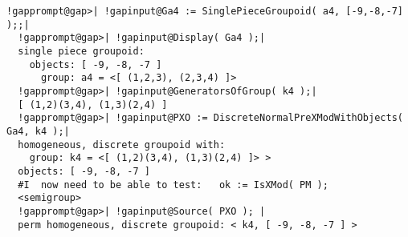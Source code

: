 \documentclass[a4paper,11pt]{report}
\begin{document}
{{\begin{Verbatim}[commandchars=!@|,fontsize=\small,frame=single,label=Example]
  !gapprompt@gap>| !gapinput@Ga4 := SinglePieceGroupoid( a4, [-9,-8,-7] );;|
  !gapprompt@gap>| !gapinput@Display( Ga4 );|
  single piece groupoid: 
    objects: [ -9, -8, -7 ]
      group: a4 = <[ (1,2,3), (2,3,4) ]>
  !gapprompt@gap>| !gapinput@GeneratorsOfGroup( k4 );|
  [ (1,2)(3,4), (1,3)(2,4) ]
  !gapprompt@gap>| !gapinput@PXO := DiscreteNormalPreXModWithObjects( Ga4, k4 );|
  homogeneous, discrete groupoid with:
    group: k4 = <[ (1,2)(3,4), (1,3)(2,4) ]> >
  objects: [ -9, -8, -7 ]
  #I  now need to be able to test:   ok := IsXMod( PM );
  <semigroup>
  !gapprompt@gap>| !gapinput@Source( PXO ); |
  perm homogeneous, discrete groupoid: < k4, [ -9, -8, -7 ] >
  
\end{Verbatim}
 }

 }

          
\end{document}
